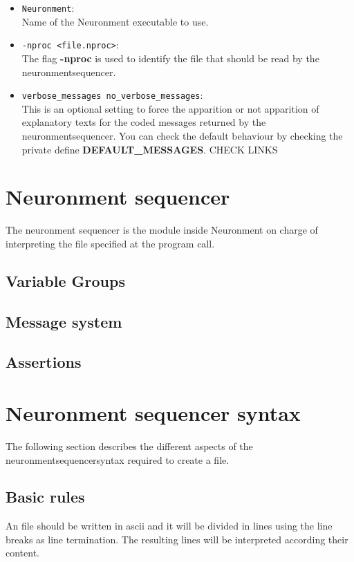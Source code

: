 \begin{itemize}
  \item \texttt{Neuronment}:\\
  Name of the Neuronment executable to use.
  \item \texttt{-nproc <file.nproc>}:\\
  The flag \textbf{-nproc} is used to identify the  file that should be read by the \gls{neuronmentsequencer}.
  \item \texttt{verbose\_messages no\_verbose\_messages}:\\
  This is an optional setting to force the apparition or not apparition of explanatory texts for the coded messages returned by the \gls{neuronmentsequencer}. You can check the default behaviour by checking the private define \textbf{DEFAULT\_MESSAGES}. {\color{red} CHECK LINKS}
\end{itemize}

\section{Neuronment sequencer}

The neuronment sequencer is the module inside Neuronment on charge of interpreting the  file specified at the program call.

\subsection{Variable Groups}

\subsection{Message system}
\subsection{Assertions}

\section{Neuronment sequencer syntax}

The following section describes the different aspects of the \gls{neuronmentsequencersyntax} required to create a  file.

\subsection{Basic rules}
An  file should be written in ascii and it will be divided in lines using the line breaks as line termination. The resulting lines will be interpreted according their content.

